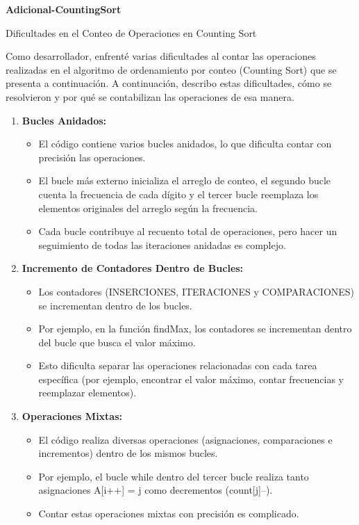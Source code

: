 \documentclass[12pt]{article}
\begin{document}
\textcolor[rgb]{0.13, 0.55, 0.13}{\textbf{Adicional-CountingSort}}
\par\vspace{0.4cm}
\par\vspace{0.4cm}
Dificultades en el Conteo de Operaciones en Counting Sort
\par\vspace{0.4cm}
Como desarrollador, enfrenté varias dificultades al contar las operaciones realizadas en el algoritmo de ordenamiento por conteo (Counting Sort) que se presenta a continuación. A continuación, describo estas dificultades, cómo se resolvieron y por qué se contabilizan las operaciones de esa manera.
\par\vspace{0.4cm}
\begin{enumerate}
    \item \textbf{Bucles Anidados:}
          \begin{itemize}
              \item El código contiene varios bucles anidados, lo que dificulta contar con precisión las operaciones.
              \item El bucle más externo inicializa el arreglo de conteo, el segundo bucle cuenta la frecuencia de cada dígito y el tercer bucle reemplaza los elementos originales del arreglo según la frecuencia.
              \item Cada bucle contribuye al recuento total de operaciones, pero hacer un seguimiento de todas las iteraciones anidadas es complejo.
          \end{itemize}

    \item \textbf{Incremento de Contadores Dentro de Bucles:}
          \begin{itemize}
              \item Los contadores (INSERCIONES, ITERACIONES y COMPARACIONES) se incrementan dentro de los bucles.
              \item Por ejemplo, en la función findMax, los contadores se incrementan dentro del bucle que busca el valor máximo.
              \item Esto dificulta separar las operaciones relacionadas con cada tarea específica (por ejemplo, encontrar el valor máximo, contar frecuencias y reemplazar elementos).
          \end{itemize}

    \item \textbf{Operaciones Mixtas:}
          \begin{itemize}
              \item El código realiza diversas operaciones (asignaciones, comparaciones e incrementos) dentro de los mismos bucles.
              \item Por ejemplo, el bucle while dentro del tercer bucle realiza tanto asignaciones A[i++] = j como decrementos (count[j]--).
              \item Contar estas operaciones mixtas con precisión es complicado.
          \end{itemize}


\end{enumerate}
\end{document}

